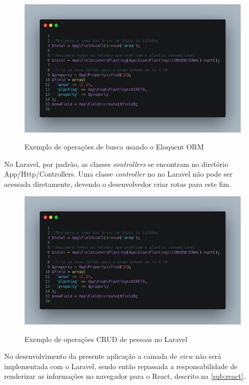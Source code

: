 \begin{figure}[H]
    \centering
    \caption{Exemplo de operações de busca usando o Eloquent ORM}
    \includegraphics[width=13cm]{dados/figuras/exemplo_Model_Eloquent.png}
    \label{fig:modelEloquent}
\end{figure}

No Laravel, por padrão, as classes \textit{controllers} se encontram no diretório App/Http/Controllers. Uma classe \textit{controller} no no Laravel não pode ser acessada diretamente, devendo o desenvolvedor criar rotas para este fim.

\begin{figure}[H]
    \centering
    \caption{Exemplo de operações CRUD de pessoas no Laravel}
    \includegraphics[width=13cm]{dados/figuras/exemplo_Model_Eloquent.png}
    \label{fig:exemploController}
\end{figure}

No desenvolvimento da presente aplicação a camada de \textit{view} não será implementada com o Laravel, sendo então repassada a responsabilidade de renderizar as informações no navegador para o React, descrito na \autoref{sub:react}.

